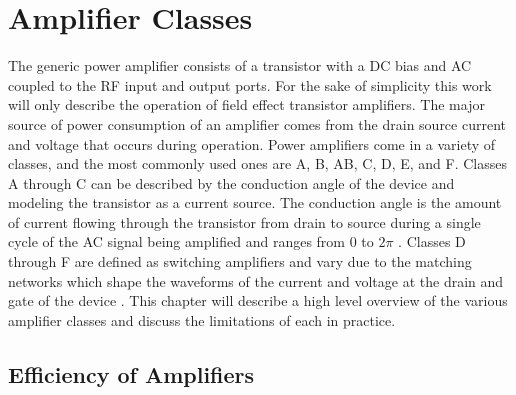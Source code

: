 \chapter{Amplifier Classes}
The generic power amplifier consists of a transistor with a DC bias and AC coupled to the RF input and output ports. For the sake of simplicity this work will only describe the operation of field effect transistor amplifiers. The major source of power consumption of an amplifier comes from the drain source current and voltage that occurs during operation. Power amplifiers come in a variety of classes, and the most commonly used ones are A, B, AB, C, D, E, and F. Classes A through C can be described by the conduction angle of the device and modeling the transistor as a current source. The conduction angle is the amount of current flowing through the transistor from drain to source during a single cycle of the AC signal being amplified and ranges from 0 to $2\pi$ \cite{Colantonio1998}. Classes D through F are defined as switching amplifiers and vary due to the matching networks which shape the waveforms of the current and voltage at the drain and gate of the device \cite{Sokal1975}. This chapter will describe a high level overview of the various amplifier classes and discuss the limitations of each in practice.



\section{Efficiency of Amplifiers}

